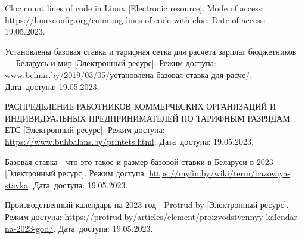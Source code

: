 \begin{thebibliography}{}
    Cloc count lines of code in Linux
    [Electronic resource].
    Mode of access: \url{https://linuxconfig.org/counting-lines-of-code-with-cloc}.
    Date of access: 19.05.2023.

    Установлены базовая ставка и тарифная сетка для расчета зарплат бюджетников — Беларусь и мир
    [Электронный ресурс].
    Режим доступа: \href{http://www.belmir.by/2019/03/05/%D1%83%D1%81%D1%82%D0%B0%D0%BD%D0%BE%D0%B2%D0%BB%D0%B5%D0%BD%D0%B0-%D0%B1%D0%B0%D0%B7%D0%BE%D0%B2%D0%B0%D1%8F-%D1%81%D1%82%D0%B0%D0%B2%D0%BA%D0%B0-%D0%B4%D0%BB%D1%8F-%D1%80%D0%B0%D1%81%D1%87%D0%B5/}
    {www.belmir.by/2019/03/05/установлена-базовая-ставка-для-расче/}.
    Дата~доступа: 19.05.2023.

    РАСПРЕДЕЛЕНИЕ РАБОТНИКОВ КОММЕРЧЕСКИХ ОРГАНИЗАЦИЙ И ИНДИВИДУАЛЬНЫХ ПРЕДПРИНИМАТЕЛЕЙ ПО ТАРИФНЫМ РАЗРЯДАМ ЕТС
    [Электронный ресурс].
    Режим доступа: \url{https://www.buhbalans.by/printets.html}.
    Дата~доступа: 19.05.2023.

    Базовая ставка - что это такое и размер базовой ставки в Беларуси в 2023
    [Электронный ресурс].
    Режим доступа: \url{https://myfin.by/wiki/term/bazovaya-stavka}.
    Дата~доступа: 19.05.2023.

    Производственный календарь на 2023 год | Protrud.by
    [Электронный ресурс].
    Режим доступа: \url{https://protrud.by/articles/element/proizvodstvennyy-kalendar-na-2023-god/}.
    Дата~доступа: 19.05.2023.
    
\end{thebibliography}
\endgroup

\newpage
